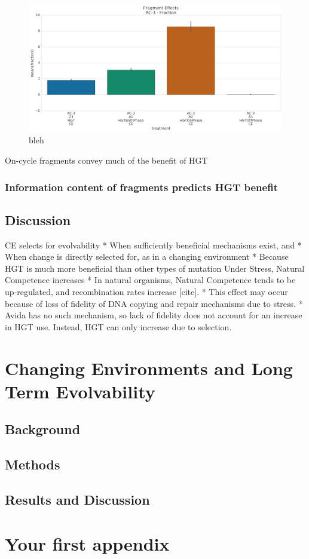 \documentclass[PhD]{msu-thesis}
\begin{document}
\begin{figure}[h!]
\begin{center}
\includegraphics[width=0.7\columnwidth]{figures/HGT/beneficial_fraction_by_cycle_phase_source.png}
\caption{bleh
}\label{fig:beneficial_fraction_by_cycle_phase_source}
\end{center}
\end{figure}

On-cycle fragments convey much of the benefit of HGT

\subsection{Information content of fragments predicts HGT benefit}


\section{Discussion}

CE selects for evolvability 
* When sufficiently beneficial mechanisms exist, and 
* When change is directly selected for, as in a changing environment
* Because HGT is much more beneficial than other types of mutation
Under Stress, Natural Competence increases
* In natural organisms, Natural Competence tends to be up-regulated, and recombination rates increase [cite]. 
* This effect may occur because of loss of fidelity of DNA copying and repair mechanisms due to stress. 
* Avida has no such mechanism, so lack of fidelity does not account for an increase in HGT use. Instead, HGT can only increase due to selection.    


\chapter{Changing Environments and Long Term Evolvability}

\section{Background}
\section{Methods}
\section{Results and Discussion}


\appendix
\chapter{Your first appendix}
\backmatter
\makebibliographypage
\SingleSpacing


\end{document}
